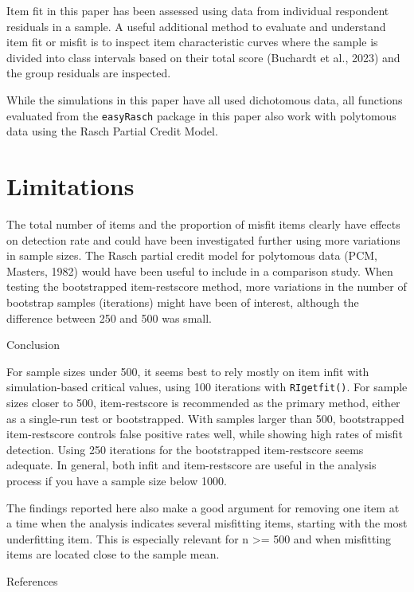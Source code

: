 \documentclass[
  letterpaper,
  DIV=11,
  numbers=noendperiod]{scrartcl}
\begin{document}
Item fit in this paper has been assessed using data from individual
respondent residuals in a sample. A useful additional method to evaluate
and understand item fit or misfit is to inspect item characteristic
curves where the sample is divided into class intervals based on their
total score (Buchardt et al., 2023) and the group residuals are
inspected.

While the simulations in this paper have all used dichotomous data, all
functions evaluated from the \texttt{easyRasch} package in this paper
also work with polytomous data using the Rasch Partial Credit Model.

\section{Limitations}\label{limitations}

The total number of items and the proportion of misfit items clearly
have effects on detection rate and could have been investigated further
using more variations in sample sizes. The Rasch partial credit model
for polytomous data (PCM, Masters, 1982) would have been useful to
include in a comparison study. When testing the bootstrapped
item-restscore method, more variations in the number of bootstrap
samples (iterations) might have been of interest, although the
difference between 250 and 500 was small.

Conclusion

For sample sizes under 500, it seems best to rely mostly on item infit
with simulation-based critical values, using 100 iterations with
\texttt{RIgetfit()}. For sample sizes closer to 500, item-restscore is
recommended as the primary method, either as a single-run test or
bootstrapped. With samples larger than 500, bootstrapped item-restscore
controls false positive rates well, while showing high rates of misfit
detection. Using 250 iterations for the bootstrapped item-restscore
seems adequate. In general, both infit and item-restscore are useful in
the analysis process if you have a sample size below 1000.

The findings reported here also make a good argument for removing one
item at a time when the analysis indicates several misfitting items,
starting with the most underfitting item. This is especially relevant
for n \textgreater= 500 and when misfitting items are located close to
the sample mean.

References
\end{document}
